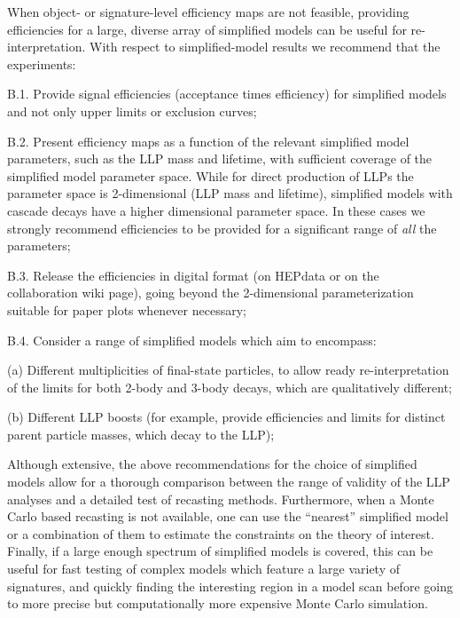 When object- or signature-level efficiency maps are not feasible, providing
efficiencies for a large, diverse array of simplified models can be 
useful for re-interpretation. 
With respect to simplified-model results we recommend that the experiments: 
\begin{description*}
  \item[B.1.] Provide signal efficiencies  (acceptance times efficiency) for 
  simplified models and not only upper limits or exclusion curves;
  \item[B.2.] Present efficiency maps as a function of the relevant simplified model
  parameters, such as the LLP mass and lifetime, with  
  sufficient coverage of the simplified model parameter space. While for 
  direct production of LLPs the parameter space is 2-dimensional
  (LLP mass and lifetime), simplified models with cascade decays have
  a higher dimensional parameter space. In these cases we strongly recommend
  efficiencies to be provided for a significant range of {\it all} the
  parameters; 
  \item[B.3.] Release the efficiencies in digital format (on HEPdata or on the 
  collaboration wiki page), going 
  beyond the 2-dimensional parameterization suitable for paper plots whenever necessary;
  \item[B.4.] Consider a range of simplified models which aim to encompass:
\begin{description*}
    \item[(a)] Different multiplicities of final-state particles, to allow ready
        re-interpretation of the limits for both 2-body and 3-body decays, which
        are qualitatively different;
    \item[(b)] Different LLP boosts (for example, provide efficiencies and limits 
        for distinct parent particle masses, which decay to the LLP);
\end{description*}
\end{description*}

\noindent 
Although extensive, the above recommendations for the choice of simplified
models allow for a thorough comparison between the range of validity of
the LLP analyses and a detailed test of recasting methods.
Furthermore, when a Monte Carlo based recasting is not available, one
can use the ``nearest'' simplified model or a combination of them to 
estimate the constraints on the theory of interest.
Finally, if a large enough spectrum of simplified models is covered, this can 
be useful for fast testing of complex models which feature a large variety of signatures, 
and quickly finding the interesting region in a model scan before going to more precise but 
computationally more expensive Monte Carlo simulation. 

